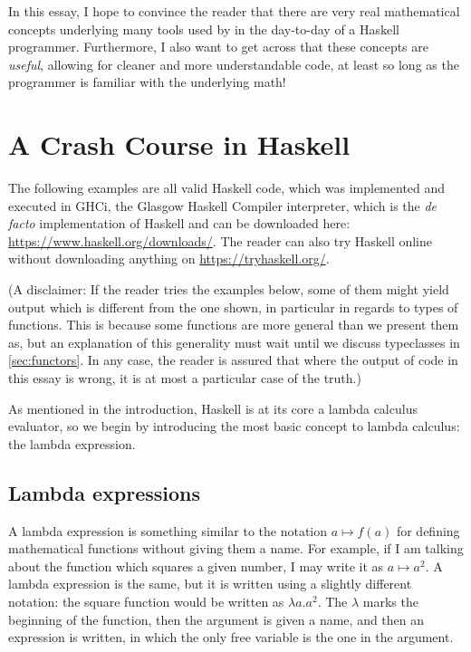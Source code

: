 \documentclass[11pt]{article}
\theoremstyle{nonumberplain}
\begin{document}
In this essay, I hope to convince the reader that there are very real mathematical concepts underlying many tools used by in the day-to-day of a Haskell programmer. Furthermore, I also want to get across that these concepts are \emph{useful}, allowing for cleaner and more understandable code, at least so long as the programmer is familiar with the underlying math!

\section{A Crash Course in Haskell}

The following examples are all valid Haskell code, which was implemented and executed in GHCi, the Glasgow Haskell Compiler interpreter, which is the \textit{de facto} implementation of Haskell and can be downloaded here: \url{https://www.haskell.org/downloads/}. The reader can also try Haskell online without downloading anything on \url{https://tryhaskell.org/}.

(A disclaimer: If the reader tries the examples below, some of them might yield output which is different from the one shown, in particular in regards to types of functions. This is because some functions are more general than we present them as, but an explanation of this generality must wait until we discuss typeclasses in \ref{sec:functors}. In any case, the reader is assured that where the output of code in this essay is wrong, it is at most a particular case of the truth.)

As mentioned in the introduction, Haskell is at its core a lambda calculus evaluator, so we begin by introducing the most basic concept to lambda calculus: the lambda expression.

\subsection{Lambda expressions}

A lambda expression is something similar to the notation $a \mapsto f(a)$ for defining mathematical functions without giving them a name. For example, if I am talking about the function which squares a given number, I may write it as $a \mapsto a^2$. A lambda expression is the same, but it is written using a slightly different notation: the square function would be written as $\lambda a. a^2$. The $\lambda$ marks the beginning of the function, then the argument is given a name, and then an expression is written, in which the only free variable is the one in the argument.
\end{document}
